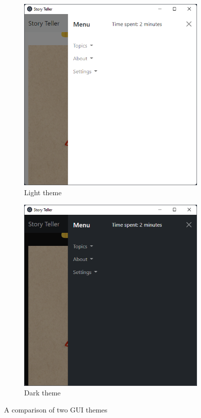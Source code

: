 \documentclass[12pt]{report}
\begin{document}
\begin{figure}[ht]
  \captionsetup[subfigure]{labelformat=empty}
  \centering
  \begin{subfigure}{.5\textwidth}
    \centering
    \includegraphics[width=.8\linewidth]{img/light_theme.png}
    \caption{Light theme}
    \label{fig:light_theme}
  \end{subfigure}%
  \begin{subfigure}{.5\textwidth}
    \centering
    \includegraphics[width=.8\linewidth]{img/dark_theme.png}
    \caption{Dark theme}
    \label{fig:dark_theme}
  \end{subfigure}
  \caption{A comparison of two GUI themes}
  \label{fig:comparison_light_dark}
\end{figure}
\end{document}

